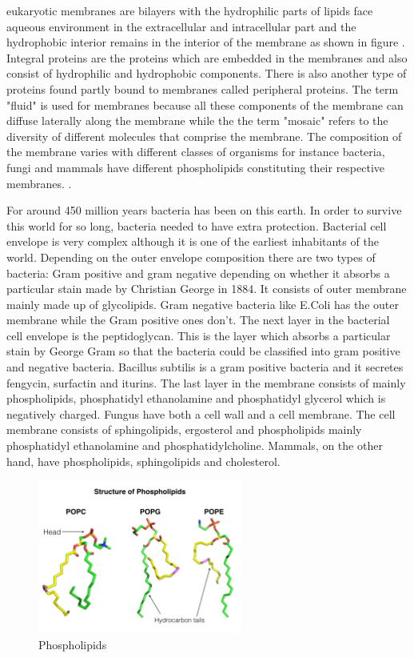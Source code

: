 eukaryotic membranes are bilayers with the hydrophilic parts of lipids face aqueous 
environment in the extracellular and intracellular part and the hydrophobic interior 
remains in the interior of the membrane as shown in figure%
. \cite{vonHippe1974,Lombard2014}
Integral proteins are the proteins which are embedded in the membranes and also consist 
of hydrophilic and hydrophobic components. There is also another type of proteins found 
partly bound to membranes called peripheral proteins. The term "fluid" is used for membranes because all these components of the membrane can diffuse laterally along the membrane while the the term "mosaic" refers to the diversity of different molecules that comprise the membrane.\cite{Lombard2014}
The composition of the membrane varies with different classes of organisms for instance bacteria, fungi and mammals have different phospholipids constituting their respective membranes. \cite{Walker2010}.

For around 450 million years bacteria has been on this earth. \cite{bacteriaevol}
In order to survive this world for so long, bacteria needed to have extra protection.
Bacterial cell envelope is very complex although it is one of the earliest inhabitants
of the world. Depending on the outer envelope composition there are two types of bacteria:
Gram positive and gram negative depending on whether it absorbs a particular stain made by Christian George in 1884.
It consists of outer membrane mainly made up of glycolipids. Gram negative bacteria like E.Coli has the outer membrane while the Gram positive ones don't.\cite{Walker2010}
The next layer in the bacterial cell envelope is the peptidoglycan. This is the layer which absorbs 
a particular stain by George Gram so that the bacteria could be classified into 
gram positive and negative bacteria. Bacillus subtilis is a gram positive bacteria and it secretes fengycin, surfactin and iturins.
The last layer in the membrane consists of mainly phospholipids, phosphatidyl ethanolamine and phosphatidyl glycerol which
is negatively charged.
 Fungus have both a cell wall and a cell membrane. The cell membrane consists of 
sphingolipids, ergosterol and phospholipids mainly phosphatidyl ethanolamine and
phosphatidylcholine.\cite{deshpande2016}
Mammals, on the other hand, have phospholipids, sphingolipids and cholesterol. \cite{Kroon2011}
\begin{figure}
\label{fig:phospholipids}
    \centering
    \includegraphics[width=0.6\textwidth]{chapter1_figs/phospholipids.jpeg}
    \caption{Phospholipids}
    \label{fig:phospholipids}
\end{figure}{}

